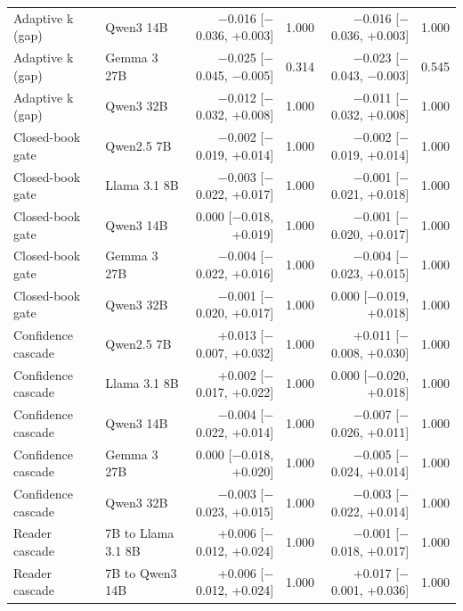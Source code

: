 \begin{table}[t]
\begin{tabular*}{\linewidth}{@{\extracolsep{\fill}}llrrrr}
Adaptive k (gap) & Qwen3 14B & $-$0.016 [$-$0.036, +0.003] & 1.000 & $-$0.016 [$-$0.036, +0.003] & 1.000 \\
Adaptive k (gap) & Gemma 3 27B & $-$0.025 [$-$0.045, $-$0.005] & 0.314 & $-$0.023 [$-$0.043, $-$0.003] & 0.545 \\
Adaptive k (gap) & Qwen3 32B & $-$0.012 [$-$0.032, +0.008] & 1.000 & $-$0.011 [$-$0.032, +0.008] & 1.000 \\
Closed-book gate & Qwen2.5 7B & $-$0.002 [$-$0.019, +0.014] & 1.000 & $-$0.002 [$-$0.019, +0.014] & 1.000 \\
Closed-book gate & Llama 3.1 8B & $-$0.003 [$-$0.022, +0.017] & 1.000 & $-$0.001 [$-$0.021, +0.018] & 1.000 \\
Closed-book gate & Qwen3 14B & 0.000 [$-$0.018, +0.019] & 1.000 & $-$0.001 [$-$0.020, +0.017] & 1.000 \\
Closed-book gate & Gemma 3 27B & $-$0.004 [$-$0.022, +0.016] & 1.000 & $-$0.004 [$-$0.023, +0.015] & 1.000 \\
Closed-book gate & Qwen3 32B & $-$0.001 [$-$0.020, +0.017] & 1.000 & 0.000 [$-$0.019, +0.018] & 1.000 \\
Confidence cascade & Qwen2.5 7B & +0.013 [$-$0.007, +0.032] & 1.000 & +0.011 [$-$0.008, +0.030] & 1.000 \\
Confidence cascade & Llama 3.1 8B & +0.002 [$-$0.017, +0.022] & 1.000 & 0.000 [$-$0.020, +0.018] & 1.000 \\
Confidence cascade & Qwen3 14B & $-$0.004 [$-$0.022, +0.014] & 1.000 & $-$0.007 [$-$0.026, +0.011] & 1.000 \\
Confidence cascade & Gemma 3 27B & 0.000 [$-$0.018, +0.020] & 1.000 & $-$0.005 [$-$0.024, +0.014] & 1.000 \\
Confidence cascade & Qwen3 32B & $-$0.003 [$-$0.023, +0.015] & 1.000 & $-$0.003 [$-$0.022, +0.014] & 1.000 \\
Reader cascade & 7B to Llama 3.1 8B & +0.006 [$-$0.012, +0.024] & 1.000 & $-$0.001 [$-$0.018, +0.017] & 1.000 \\
Reader cascade & 7B to Qwen3 14B & +0.006 [$-$0.012, +0.024] & 1.000 & +0.017 [$-$0.001, +0.036] & 1.000 \\
\bottomrule
\end{tabular*}
\end{table}
